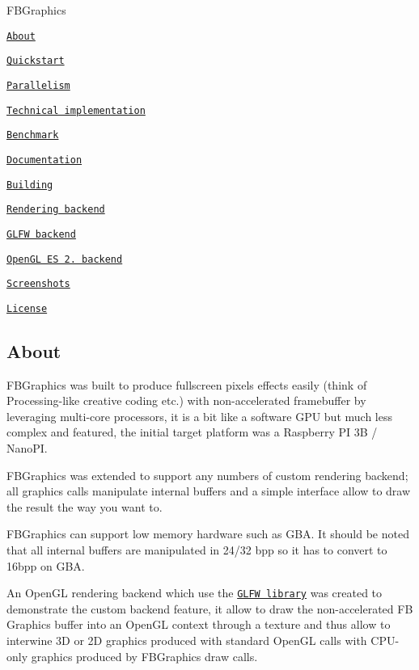 \begin{DoxyItemize}
\item F\+B\+Graphics
\begin{DoxyItemize}
\item \href{#about}{\tt About}
\begin{DoxyItemize}
\item \href{#quickstart}{\tt Quickstart}
\item \href{#parallelism}{\tt Parallelism}
\item \href{#technical-implementation}{\tt Technical implementation}
\end{DoxyItemize}
\item \href{#benchmark}{\tt Benchmark}
\item \href{#documentation}{\tt Documentation}
\item \href{#building}{\tt Building}
\item \href{#Rendering-backend}{\tt Rendering backend}
\item \href{#GLFW-backend}{\tt G\+L\+FW backend}
\item \href{#OpenGL-ES-2-backend}{\tt Open\+GL ES 2. backend}
\item \href{#screenshots}{\tt Screenshots}
\item \href{#license}{\tt License}
\end{DoxyItemize}
\end{DoxyItemize}

\subsection*{About}

F\+B\+Graphics was built to produce fullscreen pixels effects easily (think of Processing-\/like creative coding etc.) with non-\/accelerated framebuffer by leveraging multi-\/core processors, it is a bit like a software G\+PU but much less complex and featured, the initial target platform was a Raspberry PI 3B / Nano\+PI.

F\+B\+Graphics was extended to support any numbers of custom rendering backend; all graphics calls manipulate internal buffers and a simple interface allow to draw the result the way you want to.

F\+B\+Graphics can support low memory hardware such as G\+BA. It should be noted that all internal buffers are manipulated in 24/32 bpp so it has to convert to 16bpp on G\+BA.

An Open\+GL rendering backend which use the \href{http://www.glfw.org/}{\tt G\+L\+FW library} was created to demonstrate the custom backend feature, it allow to draw the non-\/accelerated FB Graphics buffer into an Open\+GL context through a texture and thus allow to interwine 3D or 2D graphics produced with standard Open\+GL calls with C\+P\+U-\/only graphics produced by F\+B\+Graphics draw calls.

